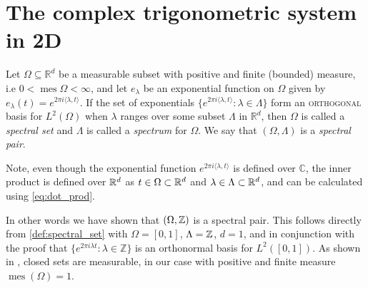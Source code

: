 \documentclass[../thesis.tex]{subfiles}
\begin{document}
\section[]{The complex trigonometric system in 2D}\label{sec:complx_trig_2d}


\begin{definition} \label{def:spectral_set}
    Let $\Omega \subseteq \mathbb{R}^d$ be a measurable subset with positive and finite (bounded) measure, i.e $0< \operatorname{mes} \Omega < \infty$, and let $e_{\lambda}$ be an exponential function on $\Omega$ given by $e_{\lambda}(t) = e^{2\pi i \langle \lambda,t  \rangle }$. If the set of exponentials $\{ e^{2\pi i \langle \lambda,t  \rangle } : \lambda \in \Lambda\}$  form an \textsc{orthogonal} basis for $L^2 (\Omega)$ when $\lambda$ ranges over some subset $\Lambda$ in $\mathbb{R}^d$, then $\Omega$ is called a \emph{spectral set} and $\Lambda$ is called a \emph{spectrum} for $\Omega$. We say that $(\Omega, \Lambda)$ is a \emph{spectral pair}. 
\end{definition} 


Note, even though the exponential function $e^{2\pi i \langle \lambda,t  \rangle }$ is defined over $\mathbb{C}$, the inner product is defined over $\mathbb{R}^d$ as $t\in \Omega\subset \mathbb{R}^d$ and $\lambda \in \Lambda \subset \mathbb{R}^d$, and can be calculated using \cref{eq:dot_prod}.


In other words we have shown that $\left(\Omega,\mathbb{Z}\right)$ is a spectral pair. This follows directly from \cref{def:spectral_set} with $\Omega = [0,1]$, $\Lambda = \mathbb{Z} $, $d=1$, and in conjunction with the proof that $\{ e^{2\pi i \lambda t} : \lambda \in \mathbb{Z} \}$ is an orthonormal basis for $L^2([0,1])$. As shown in \cite{taoIntroductionMeasureTheory2011}, closed sets are measurable, in our case with positive and finite measure $\operatorname{mes}(\Omega) = 1$. %


\end{document}
